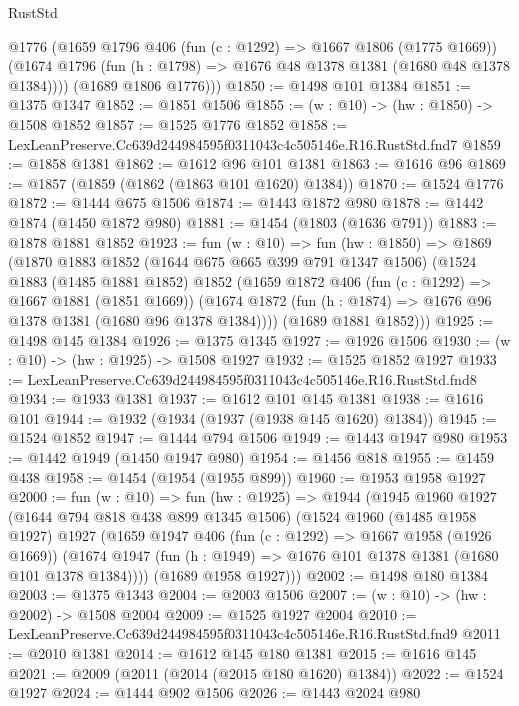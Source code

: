 \begin{lexlean}{RustStd}
\begin{coremodule}
        @1776
        (@1659
          @1796
          @406
          (fun (c : @1292) => @1667 @1806 (@1775 @1669))
          (@1674 @1796 (fun (h : @1798) => @1676 @48 @1378 @1381 (@1680 @48 @1378 @1384))))
        (@1689 @1806 @1776)))
@1850 := @1498 @101 @1384
@1851 := @1375 @1347
@1852 := @1851 @1506
@1855 := (w : @10) -> (hw : @1850) -> @1508 @1852
@1857 := @1525 @1776 @1852
@1858 := LexLeanPreserve.Cc639d244984595f0311043c4c505146e.R16.RustStd.fnd7
@1859 := @1858 @1381
@1862 := @1612 @96 @101 @1381
@1863 := @1616 @96
@1869 := @1857 (@1859 (@1862 (@1863 @101 @1620) @1384))
@1870 := @1524 @1776
@1872 := @1444 @675 @1506
@1874 := @1443 @1872 @980
@1878 := @1442 @1874 (@1450 @1872 @980)
@1881 := @1454 (@1803 (@1636 @791))
@1883 := @1878 @1881 @1852
@1923 := fun (w : @10) =>
  fun (hw : @1850) =>
  @1869
    (@1870
      @1883
      @1852
      (@1644 @675 @665 @399 @791 @1347 @1506)
      (@1524
        @1883
        (@1485 @1881 @1852)
        @1852
        (@1659
          @1872
          @406
          (fun (c : @1292) => @1667 @1881 (@1851 @1669))
          (@1674 @1872 (fun (h : @1874) => @1676 @96 @1378 @1381 (@1680 @96 @1378 @1384))))
        (@1689 @1881 @1852)))
@1925 := @1498 @145 @1384
@1926 := @1375 @1345
@1927 := @1926 @1506
@1930 := (w : @10) -> (hw : @1925) -> @1508 @1927
@1932 := @1525 @1852 @1927
@1933 := LexLeanPreserve.Cc639d244984595f0311043c4c505146e.R16.RustStd.fnd8
@1934 := @1933 @1381
@1937 := @1612 @101 @145 @1381
@1938 := @1616 @101
@1944 := @1932 (@1934 (@1937 (@1938 @145 @1620) @1384))
@1945 := @1524 @1852
@1947 := @1444 @794 @1506
@1949 := @1443 @1947 @980
@1953 := @1442 @1949 (@1450 @1947 @980)
@1954 := @1456 @818
@1955 := @1459 @438
@1958 := @1454 (@1954 (@1955 @899))
@1960 := @1953 @1958 @1927
@2000 := fun (w : @10) =>
  fun (hw : @1925) =>
  @1944
    (@1945
      @1960
      @1927
      (@1644 @794 @818 @438 @899 @1345 @1506)
      (@1524
        @1960
        (@1485 @1958 @1927)
        @1927
        (@1659
          @1947
          @406
          (fun (c : @1292) => @1667 @1958 (@1926 @1669))
          (@1674 @1947 (fun (h : @1949) => @1676 @101 @1378 @1381 (@1680 @101 @1378 @1384))))
        (@1689 @1958 @1927)))
@2002 := @1498 @180 @1384
@2003 := @1375 @1343
@2004 := @2003 @1506
@2007 := (w : @10) -> (hw : @2002) -> @1508 @2004
@2009 := @1525 @1927 @2004
@2010 := LexLeanPreserve.Cc639d244984595f0311043c4c505146e.R16.RustStd.fnd9
@2011 := @2010 @1381
@2014 := @1612 @145 @180 @1381
@2015 := @1616 @145
@2021 := @2009 (@2011 (@2014 (@2015 @180 @1620) @1384))
@2022 := @1524 @1927
@2024 := @1444 @902 @1506
@2026 := @1443 @2024 @980

\end{coremodule}
\end{lexlean}
